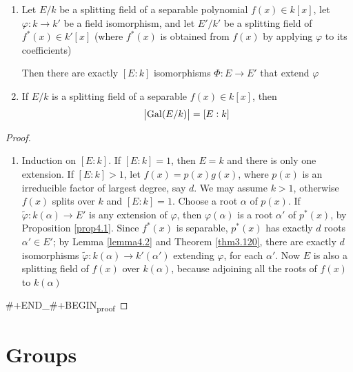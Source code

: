 \documentclass[11pt]{article}
\begin{document}
\begin{theorem}[]
\begin{enumerate}
\item Let \(E/k\) be a splitting field of a separable polynomial
\(f(x)\in k[x]\), let \(\varphi:k\to k'\) be a field isomorphism, and let 
\(E'/k'\) be a splitting field of \(f^*(x)\in k'[x]\) (where \(f^*(x)\) is
obtained from \(f(x)\) by applying \(\varphi\) to its coefficients)
\begin{center}
\end{center}
Then there are exactly \([E:k]\) isomorphisms \(\Phi:E\to E'\) that extend \(\varphi\)
\item If \(E/k\) is a splitting field of a separable \(f(x)\in k[x]\), then
\begin{equation*}
\abs{\operatorname{Gal}(E/k)}=[E:k]
\end{equation*}
\end{enumerate}
\end{theorem}


\begin{proof}
\begin{enumerate}
\item Induction on \([E:k]\). If \([E:k]=1\), then \(E=k\) and there is only one
extension. If \([E:k]>1\), let \(f(x)=p(x)g(x)\), where \(p(x)\) is an
irreducible factor of largest degree, say \(d\). We may assume \(k>1\),
otherwise \(f(x)\) splits over \(k\) and \([E:k]=1\). Choose a root \(\alpha\) of
\(p(x)\). If \(\widetilde{\varphi}:k(\alpha)\to E'\) is any extension of \(\varphi\), then
\(\varphi(\alpha)\) is a root \(\alpha'\) of \(p^*(x)\), by Proposition \ref{prop4.1}.
Since \(f^*(x)\) is separable, \(p^*(x)\) has exactly \(d\) roots
\(\alpha'\in E'\); by Lemma \ref{lemma4.2} and Theorem \ref{thm3.120}, there
are exactly \(d\) isomorphisms \(\widetilde{\varphi}:k(\alpha)\to k'(\alpha')\)
extending \(\varphi\), for each \(\alpha'\). Now \(E\) is also a splitting field of
\(f(x)\) over \(k(\alpha)\), because adjoining all the roots of \(f(x)\) to
\(k(\alpha)\)
\end{enumerate}
\#+END\_\#+BEGIN\textsubscript{proof}
\end{proof}
\section{Groups }
\label{sec:orgabd6482}
\end{document}
